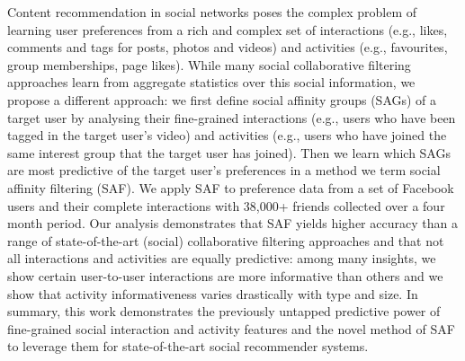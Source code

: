 Content recommendation in social networks poses the complex problem of
learning user preferences from a rich and complex set of interactions
(e.g., likes, comments and tags for posts, photos and videos) and
activities (e.g., favourites, group memberships, page likes).  While
many social collaborative filtering approaches learn from aggregate statistics over this
social information, we propose a different approach: we first define
social affinity groups (SAGs) of a target user by analysing their
fine-grained interactions (e.g., users who have been tagged in the
target user's video) and activities (e.g., users who have joined the
same interest group that the target user has joined).  Then we
learn which SAGs are most predictive of the target user's preferences
in a method we term social affinity filtering (SAF).  We apply SAF to
preference data from a set of Facebook users and their
complete interactions with 38,000+ friends collected over a four month
period.  Our analysis demonstrates that SAF yields higher accuracy
than a range of state-of-the-art (social) collaborative filtering approaches and that not all
interactions and activities are equally predictive: among many insights, 
we show certain user-to-user interactions are more
informative than others %
and we show that activity informativeness varies drastically with type and size.
 In summary, this work demonstrates the previously untapped
predictive power of fine-grained social interaction and activity
features and the novel method of SAF to leverage them for
state-of-the-art social recommender systems.

